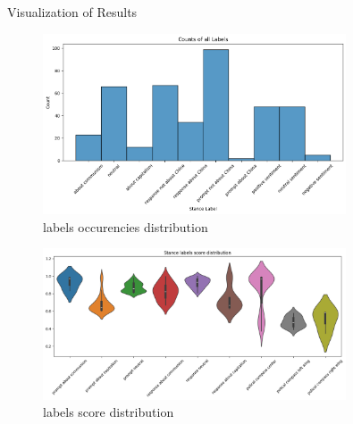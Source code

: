 \documentclass{beamer}
\begin{document}
\begin{frame}{Visualization of Results}
    \begin{figure}
        \centering
        \includegraphics[width=0.8\textwidth]{plots/summary_hist.png} %
        \caption{labels occurencies distribution}
    \end{figure}
\end{frame}

\begin{frame}
    \begin{figure}
        \centering
        \includegraphics[width=0.8\textwidth]{plots/label_score_distribution_violin.png} %
        \caption{labels score distribution}
    \end{figure}
\end{frame}
\end{document}
